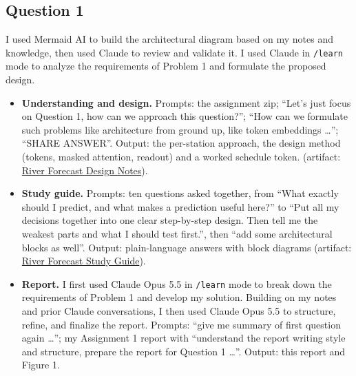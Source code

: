 \documentclass[10pt,a4paper]{article}
\begin{document}
\subsection{Question 1}
I used Mermaid AI to build the architectural diagram based on my notes and knowledge, then used Claude to review and validate it. I used Claude in \texttt{/learn} mode to analyze the requirements of Problem 1 and formulate the proposed design.
\begin{itemize}
\item \textbf{Understanding and design.} Prompts: the assignment zip; ``Let's just focus on Question 1, how can we approach this question?''; ``How can we formulate such problems like architecture from ground up, like token embeddings \dots''; ``SHARE ANSWER''. Output: the per-station approach, the design method (tokens, masked attention, readout) and a worked schedule token. (artifact: \href{https://drive.google.com/file/d/1dPEW6yz6XJP6TbEB3uXsjzDoKoRwyV4H/view?usp=sharing}{River Forecast Design Notes}).
\item \textbf{Study guide.} Prompts: ten questions asked together, from ``What exactly should I predict, and what makes a prediction useful here?'' to ``Put all my decisions together into one clear step-by-step design. Then tell me the weakest parts and what I should test first.'', then ``add some architectural blocks as well''. Output: plain-language answers with block diagrams (artifact: \href{https://drive.google.com/file/d/1p3HH_8zBmhvQWoTHxchM9M3awnjqbeNx/view?usp=sharing}{River Forecast Study Guide}).
\item \textbf{Report.} I first used Claude Opus 5.5 in \texttt{/learn} mode to break down the requirements of Problem 1 and develop my solution. Building on my notes and prior Claude conversations, I then used Claude Opus 5.5 to structure, refine, and finalize the report. Prompts: ``give me summary of first question again \dots''; my Assignment 1 report with ``understand the report writing style and structure, prepare the report for Question 1 \dots''. Output: this report and Figure 1.
\end{itemize}
\end{document}
